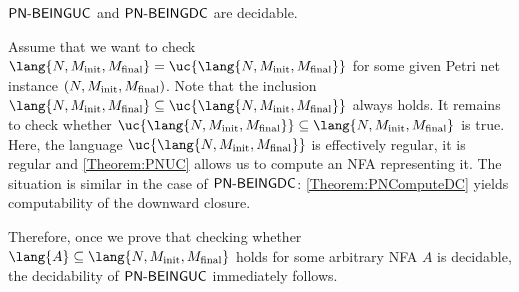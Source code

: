\documentclass[../../diss.tex]{subfiles}
\begin{document}
\begin{theorem}%
\label{Theorem:PNCOVUCDCDecidable}%
    $\mathsf{PN\text{-}BEINGUC}$ and $\mathsf{PN\text{-}BEINGDC}$ are decidable.
\end{theorem}

Assume that we want to check $\lang{N,\Minit,\Mfinal} = \uc{\lang{N,\Minit,\Mfinal}}$ for some given Petri net instance $(N,M_{\text{init}},M_{\text{final}})$.
Note that the inclusion $\lang{N,\Minit,\Mfinal} \subseteq \uc{\lang{N,\Minit,\Mfinal}}$ always holds.
It remains to check whether $\uc{\lang{N,\Minit,\Mfinal}} \subseteq \lang{N,\Minit,\Mfinal}$ is true.
Here, the language $\uc{\lang{N,\Minit,\Mfinal}}$ is effectively regular, \ie it is regular and \cref{Theorem:PNUC} allows us to compute an NFA representing it.
The situation is similar in the case of $\mathsf{PN\text{-}BEINGDC}$: \cref{Theorem:PNComputeDC} yields computability of the downward closure.

Therefore, once we prove that checking whether $\lang{A} \subseteq \lang{N,\Minit,\Mfinal}$ holds for some arbitrary NFA $A$ is decidable, the decidability of $\mathsf{PN\text{-}BEINGUC}$ immediately follows.
\end{document}
